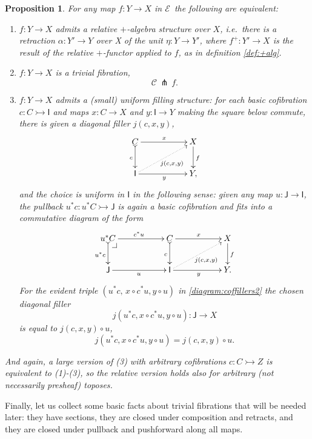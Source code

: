 \documentclass[11pt,reqno]{amsart}
\makeatletter
\newcommand{\EE}{\ensuremath{\mathcal{E}}}
\newcommand{\rep}[1]{\ensuremath{\mathsf{#1}}}%
\newcommand{\mono}{\ensuremath{\rightarrowtail}}
\newcommand{\ra}{\ensuremath{\rightarrow}}
\newcommand{\cof}{\ensuremath{\rightarrowtail}}
\newtheorem{proposition}[theorem]{Proposition}
\theoremstyle{remark}
\theoremstyle{definition}
\newcommand{\pbcorner}[1][dr]{\save*!/#1-1.2pc/#1:(-1,1)@^{|-}\restore}
\makeatother
\begin{document}
 \begin{proposition}\label{prop:uniformstructequivrelative} For any map $f : Y\ra X$ in \EE\ the following are equivalent:
\begin{enumerate}
\item $f:Y\ra X$ admits a \emph{relative $+$-algebra structure over $X$}, i.e.\ there is a retraction  $\alpha :Y' \ra Y$ over X of the unit $\eta : Y\ra Y'$, where $f^+ : Y' \ra X$ is the result of the relative $+$-functor applied to $f$, as in definition \ref{def:+alg}.
\item $f:Y\ra  X$ is a \emph{trivial fibration},
\[
\mathcal{C}\, \pitchfork\,f.
\]
\item $f:Y\ra  X$ admits a (small) \emph{uniform filling structure}: 
for each basic cofibration $c : C \mono \rep{I}$ and maps $x : C\ra X$ and $y : \rep{I}\ra Y$ making the square below commute, there is given a diagonal filler $j(c,x,y)$,
\begin{equation}\label{diagram:coffillers}
\xymatrix{
C \ar@{>->}[d]_{c} \ar[rr]^{x} && X \ar[d]^{f} \\
\rep{I}\ar@{.>}[rru]_{j(c,x,y)} \ar[rr]_{y} && Y,
}
\end{equation}
and the choice is \emph{uniform in $\rep{I}$} in the following sense: given any map $u : \rep{J} \ra \rep{I}$, the pullback $u^*c : u^*C\mono \rep{J}$ is again a basic cofibration and fits into a commutative diagram of the form
\begin{equation}\label{diagram:coffillers2}
\xymatrix{
u^*C \ar@{>->}[d]_{u^*c} \ar[rr]^{c^*u} \pbcorner &&  C \ar@{>->}[d]_{c} \ar[rr]^{x} && X\ar[d]^{f} \\
\rep{J} \ar[rr]_{u} && \rep{I} \ar@{.>}[rru]_{j(c,x,y)} \ar[rr]_{y} && Y.
}
\end{equation}
For the evident triple $(u^*c,\, x\circ c^*u, y\circ u)$ in \eqref{diagram:coffillers2} the chosen diagonal filler 
\[
j(u^*c,x\circ c^*u,y\circ u): \rep{J} \ra X
\]
 is equal to  $j(c,x,y)\circ u$,
\begin{equation}\label{eq:uniformfillers1}
j(u^*c, x\circ c^*u,y\circ u) = j(c,x,y)\circ u.
\end{equation}
\end{enumerate}
And again, a large version of (3) with arbitrary cofibrations $c : C\cof Z$ is equivalent to (1)-(3), so the relative version holds also for arbitrary (not necessarily presheaf) toposes.
\end{proposition}

Finally, let us collect some basic facts about trivial fibrations that will be needed later: they have sections, they are closed under composition and retracts, and they are closed under pullback and pushforward along all maps.
\end{document}
